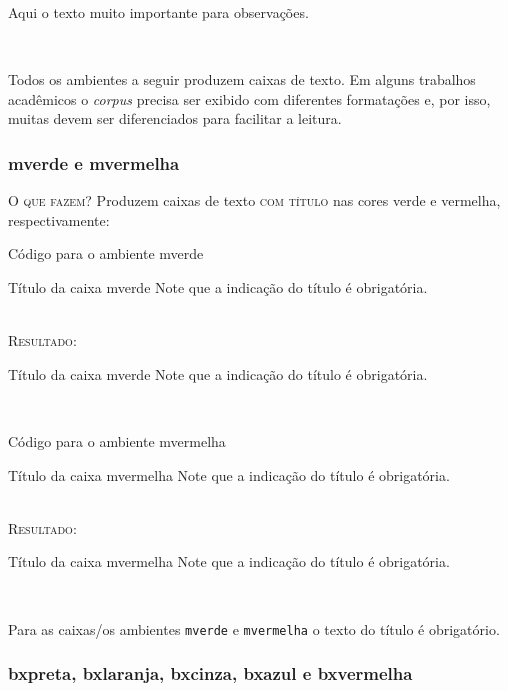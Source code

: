 \documentclass[a4paper,12pt,oneside,openright,extrafontsizes,openbib]{memoir}
\begin{document}
{\begin{observ}
	Aqui o texto muito importante para observações.
\end{observ}
\ \\

Todos os ambientes a seguir produzem caixas de texto. Em alguns trabalhos acadêmicos o \textit{corpus} precisa ser exibido com diferentes formatações e, por isso, muitas devem ser diferenciados para facilitar a leitura. 

\subsubsection{mverde e mvermelha}

\textsc{O que fazem?} Produzem caixas de texto \textsc{com título} nas cores verde e vermelha, respectivamente:
\ \\

\begin{codex}{Código para o ambiente mverde}
	\begin{mverde}{Título da caixa mverde}
	Note que a indicação do título é obrigatória.
	\end{mverde}
\end{codex}
\ \\

\textsc{Resultado:}
\begin{mverde}{Título da caixa mverde}
	Note que a indicação do título é obrigatória.
\end{mverde}
\ \\

\begin{codex}{Código para o ambiente mvermelha}
	\begin{mvermelha}{Título da caixa mvermelha}
	Note que a indicação do título é obrigatória.
	\end{mvermelha}
\end{codex}
\ \\

\textsc{Resultado:}
\begin{mvermelha}{Título da caixa mvermelha}
	Note que a indicação do título é obrigatória.
\end{mvermelha}
\ \\

\noindent{} 

Para as caixas/os ambientes \verb|mverde| e \verb|mvermelha| o texto do título é obrigatório.

\subsubsection{bxpreta, bxlaranja, bxcinza, bxazul e bxvermelha}

}
\end{document}
